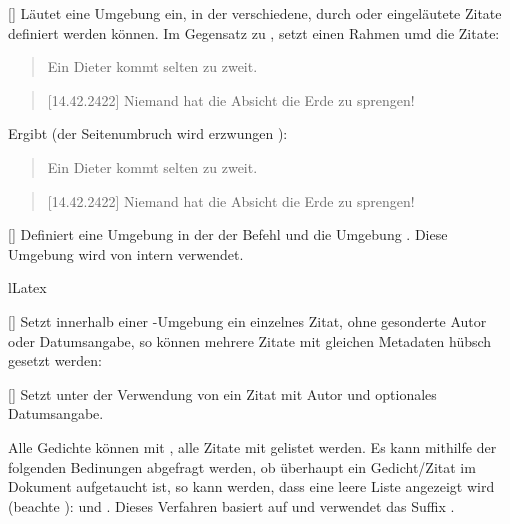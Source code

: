 []
Läutet eine Umgebung ein, in der verschiedene, durch  oder  eingeläutete Zitate definiert werden können. Im Gegensatz zu , setzt  einen Rahmen umd die Zitate:
\begin{latex}
\begin{quotes}
    \begin{quote}
        Ein Dieter kommt selten zu zweit.
    \end{quote}
    \begin{quote}[14.42.2422]
        Niemand hat die Absicht die Erde zu sprengen!
    \end{quote}
\end{quotes}
\end{latex}
Ergibt (der Seitenumbruch wird erzwungen \Smiley):
\begin{quotes}[Testzitate]
    \begin{quote}
        Ein Dieter kommt selten zu zweit.
    \end{quote}
    \begin{quote}[14.42.2422]
        Niemand hat die Absicht die Erde zu sprengen!
    \end{quote}
\end{quotes}

%
%
%

[]
Definiert eine Umgebung in der der Befehl  und die Umgebung . Diese Umgebung wird von  intern verwendet.

\begin{defaultlst}[][listing side text,righthand width=3.5cm]{lLatex}
\begin{quotes*}
\end{quotes*}
\end{defaultlst}

%
%
%

[]
Setzt innerhalb einer -Umgebung ein einzelnes Zitat, ohne gesonderte Autor oder Datumsangabe, so können mehrere Zitate mit gleichen Metadaten hübsch gesetzt werden:

%
%
%

[]
Setzt unter der Verwendung von  ein Zitat mit Autor und optionales Datumsangabe.
\begin{bemerkung}
    Alle Gedichte können mit , alle Zitate mit  gelistet werden. Es kann mithilfe der folgenden Bedinungen abgefragt werden, ob überhaupt ein Gedicht/Zitat im Dokument aufgetaucht ist, so kann  werden, dass eine leere Liste angezeigt wird (beachte ):  und . Dieses Verfahren basiert auf  und verwendet das Suffix .
\end{bemerkung}

